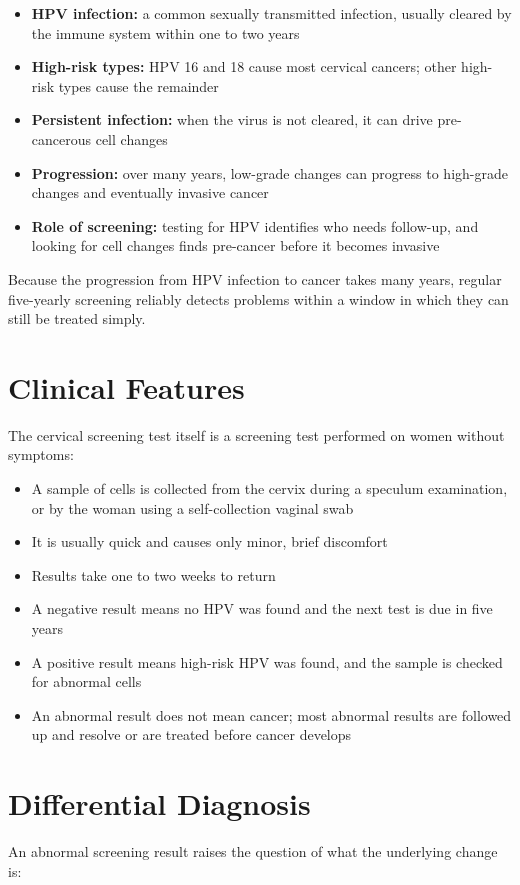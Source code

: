 \begin{itemize}
    \item \textbf{HPV infection:} a common sexually transmitted infection, usually cleared by the immune system within one to two years
    \item \textbf{High-risk types:} HPV 16 and 18 cause most cervical cancers; other high-risk types cause the remainder
    \item \textbf{Persistent infection:} when the virus is not cleared, it can drive pre-cancerous cell changes
    \item \textbf{Progression:} over many years, low-grade changes can progress to high-grade changes and eventually invasive cancer
    \item \textbf{Role of screening:} testing for HPV identifies who needs follow-up, and looking for cell changes finds pre-cancer before it becomes invasive
\end{itemize}

Because the progression from HPV infection to cancer takes many years, regular five-yearly screening reliably detects problems within a window in which they can still be treated simply.

\section*{Clinical Features}
The cervical screening test itself is a screening test performed on women without symptoms:

\begin{itemize}
    \item A sample of cells is collected from the cervix during a speculum examination, or by the woman using a self-collection vaginal swab
    \item It is usually quick and causes only minor, brief discomfort
    \item Results take one to two weeks to return
    \item A negative result means no HPV was found and the next test is due in five years
    \item A positive result means high-risk HPV was found, and the sample is checked for abnormal cells
    \item An abnormal result does not mean cancer; most abnormal results are followed up and resolve or are treated before cancer develops
\end{itemize}

\section*{Differential Diagnosis}
An abnormal screening result raises the question of what the underlying change is:

